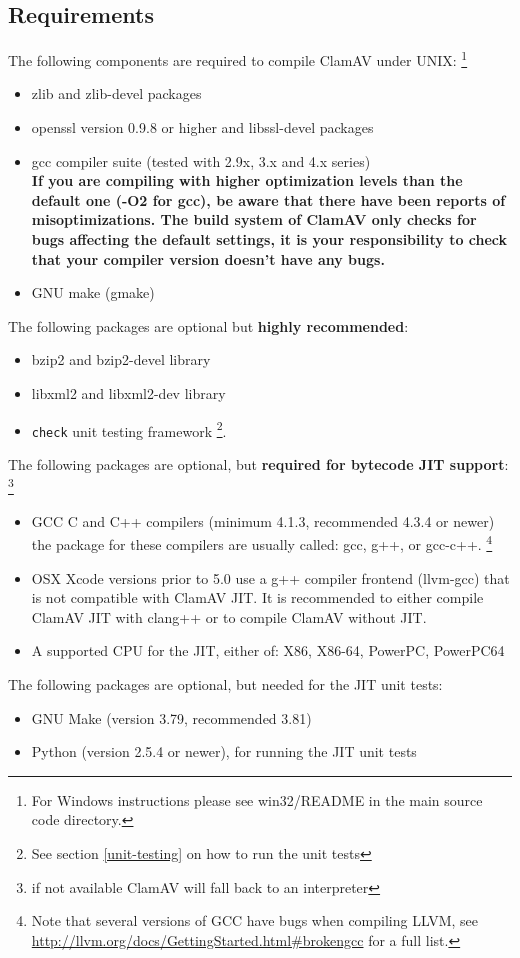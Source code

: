 \documentclass[a4paper,titlepage,12pt]{article}
\begin{document}
    \subsection{Requirements}\label{sec:components}
    The following components are required to compile ClamAV under UNIX:
    \footnote{For Windows instructions please see win32/README in the
    main source code directory.}
    \begin{itemize}
	\item zlib and zlib-devel packages
    \item openssl version 0.9.8 or higher and libssl-devel packages
	\item gcc compiler suite (tested with 2.9x, 3.x and 4.x series)\\
	      \textbf{If you are compiling with higher optimization levels
	      than the default one (\hbox{-O2} for gcc), be aware that there
	      have been reports of misoptimizations. The build system of ClamAV
	      only checks for bugs affecting the default settings, it is your
	      responsibility to check that your compiler version doesn't
	      have any bugs.}
    \item GNU make (gmake)
    \end{itemize}
    The following packages are optional but \textbf{highly recommended}:
    \begin{itemize}
	\item bzip2 and bzip2-devel library
        \item libxml2 and libxml2-dev library
	\item \verb+check+ unit testing framework \footnote{See section \ref{unit-testing} on how to run the unit tests}.
    \end{itemize}
    The following packages are optional, but \textbf{required for bytecode JIT support}:
    \footnote{if not available ClamAV will fall back to an interpreter}
    \begin{itemize}
        \item GCC C and C++ compilers (minimum 4.1.3, recommended 4.3.4 or newer)\\
	    the package for these compilers are usually called: gcc, g++, or gcc-c++.
	    \footnote{Note that several versions of GCC have bugs when compiling LLVM, see
		\url{http://llvm.org/docs/GettingStarted.html#brokengcc} for a
		    full list.}
	\item OSX Xcode versions prior to 5.0 use a g++ compiler frontend (llvm-gcc) that is not 
	    compatible with ClamAV JIT. It is recommended to either compile ClamAV JIT with 
	    clang++ or to compile ClamAV without JIT.
	\item A supported CPU for the JIT, either of: X86, X86-64, PowerPC, PowerPC64
    \end{itemize}
    The following packages are optional, but needed for the JIT unit tests:
    \begin{itemize}
     \item GNU Make (version 3.79, recommended 3.81)
     \item Python (version 2.5.4 or newer), for running the JIT unit tests
    \end{itemize}
\end{document}
